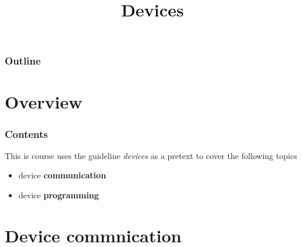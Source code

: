 %
%
%
%
%
%

%
%

%
%

\def\path{../../..}

%
%



%
%

\title{Devices}

\usepackage{listings}
\usepackage{color}
\usepackage{verbatim}
\usepackage{graphicx}

%
%



%
%

\begin{frame}
  \titlepage
\end{frame}

%
%

\begin{frame}
  \frametitle{Outline}

  \tableofcontents
\end{frame}

%
%

\section{Overview}


\begin{frame}
  \frametitle{Contents}

  This is course uses the guideline \textit{devices} as a pretext to cover the
  following topics
  \begin{itemize}
  \item device \textbf{communication}
  \item device \textbf{programming}
  \end{itemize}

\end{frame}


%
%

\section{Device commnication}

